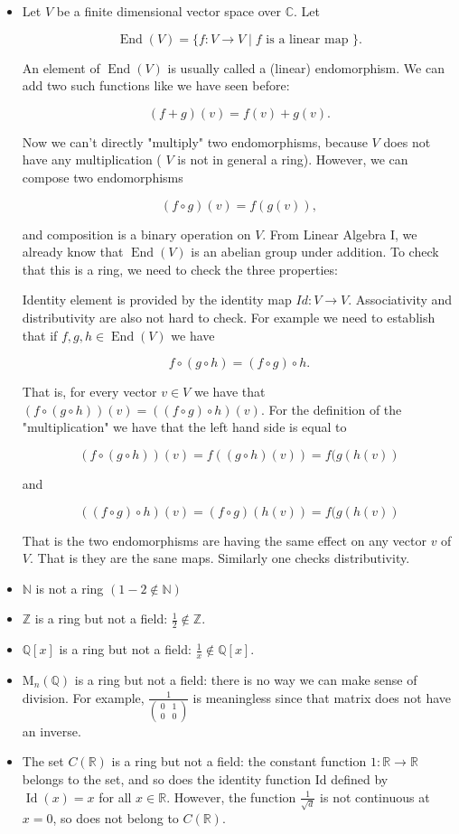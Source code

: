   \begin{itemize}
    \item Let $V$ be a finite dimensional vector space over $\mathbb{C}$. Let

$$
\operatorname{End}(V)=\{f: V \rightarrow V \mid f \text { is a linear map }\} .
$$

An element of $\operatorname{End}(V)$ is usually called a (linear) endomorphism. We can add two such functions like we have seen before:

$$
(f+g)(v)=f(v)+g(v) .
$$

Now we can't directly "multiply" two endomorphisms, because $V$ does not have any multiplication ( $V$ is not in general a ring). However, we can compose two endomorphisms

$$
(f \circ g)(v)=f(g(v)),
$$

and composition is a binary operation on $V$. From Linear Algebra I, we already know that $\operatorname{End}(V)$ is an abelian group under addition. To check that this is a ring, we need to check the three properties:

Identity element is provided by the identity map $I d: V \rightarrow V$. Associativity and distributivity are also not hard to check. For example we need to establish that if $f, g, h \in \operatorname{End}(V)$ we have

$$
f \circ(g \circ h)=(f \circ g) \circ h .
$$

That is, for every vector $v \in V$ we have that $(f \circ(g \circ h))(v)=((f \circ g) \circ h)(v)$. For the definition of the "multiplication" we have that the left hand side is equal to

$$
(f \circ(g \circ h))(v)=f((g \circ h)(v))=f(g(h(v))
$$

and

$$
((f \circ g) \circ h)(v)=(f \circ g)(h(v))=f(g(h(v))
$$

That is the two endomorphisms are having the same effect on any vector $v$ of $V$. That is they are the sane maps. Similarly one checks distributivity.


\item $\mathbb{N}$ is not a ring $(1-2 \notin \mathbb{N})$
\item $\mathbb{Z}$ is a ring but not a field: $\frac{1}{2} \notin \mathbb{Z}$.
\item $\mathbb{Q}[x]$ is a ring but not a field: $\frac{1}{x} \notin \mathbb{Q}[x]$.
\item $\mathrm{M}_n(\mathbb{Q})$ is a ring but not a field: there is no way we can make sense of division. For example, $\frac{1}{\left(\begin{array}{ll}0 & 1 \\ 0 & 0\end{array}\right)}$ is meaningless since that matrix does not have an inverse.
\item The set $C(\mathbb{R})$ is a ring but not a field: the constant function $1: \mathbb{R} \rightarrow \mathbb{R}$ belongs to the set, and so does the identity function Id defined by $\operatorname{Id}(x)=x$ for all $x \in \mathbb{R}$. However, the function $\frac{1}{\sqrt{d}}$ is not continuous at $x=0$, so does not belong to $C(\mathbb{R})$.


\end{itemize}
